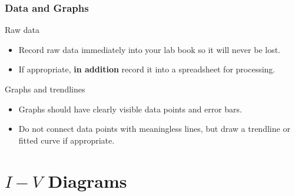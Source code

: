 \documentclass[beamer]{standalone}
\begin{document}
\begin{frame}
\frametitle{Data and Graphs}
\begin{block}{Raw data}
 \begin{itemize}
  \item Record raw data immediately into your lab book so it will never be lost.
  \item If appropriate, \textbf{in addition} record it into a spreadsheet for processing.
 \end{itemize}
\end{block}
\begin{block}{Graphs and trendlines}
 \begin{itemize}
  \item Graphs should have clearly visible data points and error bars.
  \item Do not connect data points with meaningless lines, but draw a trendline or fitted curve if appropriate.
 \end{itemize}
\end{block}
\end{frame}

\section{$I-V$ Diagrams}
\end{document}
